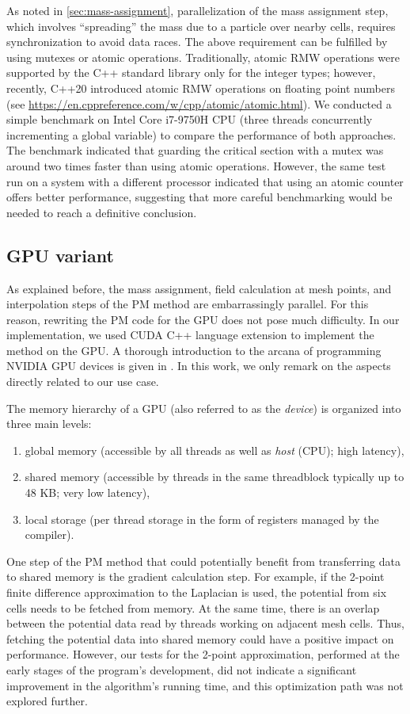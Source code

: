 As noted in \autoref{sec:mass-assignment}, parallelization of the mass assignment step, which involves ``spreading'' the mass due to a particle over nearby cells, requires synchronization to avoid data races.
The above requirement can be fulfilled by using mutexes or atomic operations.
Traditionally, atomic RMW operations were supported by the C++ standard library only for the integer types; however, recently, C++20 introduced atomic RMW operations on floating point numbers (see \url{https://en.cppreference.com/w/cpp/atomic/atomic.html}).
We conducted a simple benchmark on Intel Core i7-9750H CPU (three threads concurrently incrementing a global variable) to compare the performance of both approaches.
The benchmark indicated that guarding the critical section with a mutex was around two times faster than using atomic operations.
However, the same test run on a system with a different processor indicated that using an atomic counter offers better performance, suggesting that more careful benchmarking would be needed to reach a definitive conclusion.

\subsection{GPU variant}\label{subsec:gpu-variant}
As explained before, the mass assignment, field calculation at mesh points, and interpolation steps of the PM method are embarrassingly parallel.
For this reason, rewriting the PM code for the GPU does not pose much difficulty.
In our implementation, we used CUDA C++ language extension to implement the method on the GPU.
A thorough introduction to the arcana of programming NVIDIA GPU devices is given in \cite{nvidia2025cuda}.
In this work, we only remark on the aspects directly related to our use case.

The memory hierarchy of a GPU (also referred to as the \textit{device}) is organized into three main levels:
\begin{enumerate}
    \item global memory (accessible by all threads as well as \textit{host} (CPU); high latency),
    \item shared memory (accessible by threads in the same threadblock typically up to 48 KB; very low latency),
    \item local storage (per thread storage in the form of registers managed by the compiler).
\end{enumerate}
One step of the PM method that could potentially benefit from transferring data to shared memory is the gradient calculation step.
For example, if the 2-point finite difference approximation to the Laplacian is used, the potential from six cells needs to be fetched from memory.
At the same time, there is an overlap between the potential data read by threads working on adjacent mesh cells.
Thus, fetching the potential data into shared memory could have a positive impact on performance.
However, our tests for the 2-point approximation, performed at the early stages of the program's development, did not indicate a significant improvement in the algorithm's running time, and this optimization path was not explored further.

